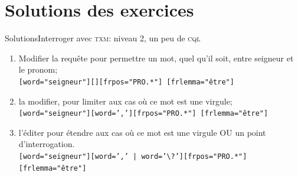 \documentclass{beamer}
\begin{document}


\appendix

\section{Solutions des exercices}

\begin{frame}{Solutions}{Interroger avec \textsc{txm}: niveau 2, un peu de \textsc{cql}}

\begin{enumerate}
	\item Modifier la requête pour permettre un mot, quel qu'il soit, entre seigneur et le pronom;\\
	\texttt{[word="seigneur"][][frpos="PRO.*"] [frlemma="être"]}
	\item la modifier, pour limiter aux cas où ce mot est une virgule;\\
	\texttt{[word="seigneur"][word=','][frpos="PRO.*"] [frlemma="être"] }
	\item l'éditer pour étendre aux cas où ce mot est une virgule OU un point d'interrogation.\\
	\texttt{[word="seigneur"][word=',' | word='\textbackslash?'][frpos="PRO.*"] [frlemma="être"] }
\end{enumerate}

\end{frame}
\end{document}
